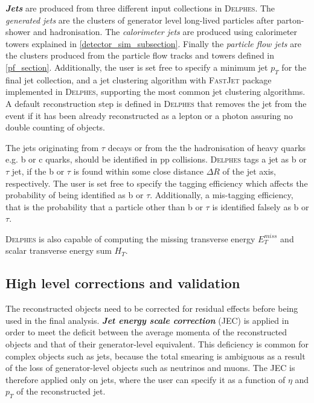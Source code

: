 {\emph{\textbf{Jets}} are produced from three different input collections in \textsc{Delphes}. The \emph{generated jets} are the clusters of generator level long-lived particles after parton-shower and hadronisation. The \emph{calorimeter jets} are produced using calorimeter towers explained in \autoref{detector_sim_subsection}. Finally the \emph{particle flow jets} are the clusters produced from the particle flow tracks and towers defined in \autoref{pf_section}. Additionally, the user is set free to specify a minimum jet $p_T$ for the final jet collection, and a jet clustering algorithm with \textsc{FastJet} package \cite{Cacciari2012} implemented in \textsc{Delphes}, supporting the most common jet clustering algorithms. A default reconstruction step is defined in \textsc{Delphes} that removes the jet from the event if it has been already reconstructed as a lepton or a photon assuring no double counting of objects.

The jets originating from $\tau$ decays or from the the hadronisation of heavy quarks e.g. b or c quarks, should be identified in pp collisions. \textsc{Delphes} tags a jet as b or $\tau$ jet, if the b or $\tau$ is found within some close distance $\Delta R$ of the jet axis, respectively. The user is set free to specify the tagging efficiency which affects the probability of being identified as b or $\tau$. Additionally, a mis-tagging efficiency, that is the probability that a particle other than b or $\tau$ is identified falsely as b or $\tau$.

\textsc{Delphes} is also capable of computing the missing transverse energy $E_T^{miss}$ and scalar transverse energy sum $H_T$.

\subsection{High level corrections and validation}

The reconstructed objects need to be corrected for residual effects before being used in the final analysis. \emph{\textbf{Jet energy scale correction}} (JEC) is applied in order to meet the deficit between the average momenta of the reconstructed objects and that of their generator-level equivalent. This deficiency is common for complex objects such as jets, because the total smearing is ambiguous as a result of the loss of generator-level objects such as neutrinos and muons. The JEC is therefore applied only on jets, where the user can specify it as a function of $\eta$ and $p_T$ of the reconstructed jet.

}
